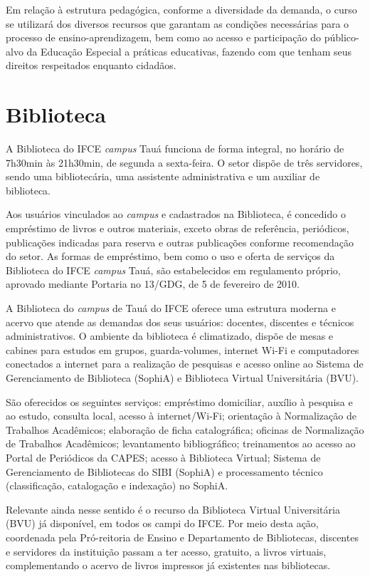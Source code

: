 \documentclass[
	12pt,				%
	openright,			%
	twoside,			%
	a4paper,			%
	chapter=TITLE,		%
	english,			%
	french,				%
	spanish,			%
	brazil,				%
	]{abntex2}
\begin{document}
Em relação à estrutura pedagógica, conforme a diversidade da demanda, o curso se utilizará dos diversos recursos que garantam as condições necessárias para o processo de ensino-aprendizagem, bem como ao acesso e participação do público-alvo da Educação Especial a práticas educativas, fazendo com que tenham seus direitos respeitados enquanto cidadãos.


\section{Biblioteca}

A Biblioteca do IFCE \textit{campus} Tauá funciona de forma integral, no horário de 7h30min às 21h30min, de segunda a sexta-feira. O setor dispõe de três servidores, sendo uma bibliotecária,  uma assistente administrativa e um auxiliar de biblioteca.

Aos usuários vinculados ao \textit{campus} e cadastrados na Biblioteca, é concedido o empréstimo de livros e outros materiais, exceto obras de referência, periódicos, publicações indicadas para reserva e outras publicações conforme recomendação do setor. As formas de empréstimo, bem como o uso e oferta de serviços da Biblioteca do IFCE \textit{campus} Tauá, são estabelecidos em regulamento próprio, aprovado mediante Portaria no 13/GDG, de 5 de fevereiro de 2010. 

A Biblioteca do \textit{campus} de Tauá do IFCE oferece uma estrutura moderna e acervo que atende as demandas dos seus usuários: docentes, discentes e técnicos administrativos. O ambiente da biblioteca é climatizado, dispõe de mesas e cabines para estudos em grupos, guarda-volumes, internet Wi-Fi e computadores conectados a internet para a realização de pesquisas e acesso online ao Sistema de Gerenciamento de Biblioteca (SophiA) e Biblioteca Virtual Universitária (BVU).

São oferecidos os seguintes serviços: empréstimo domiciliar, auxílio à pesquisa e ao estudo, consulta local, acesso à internet/Wi-Fi; orientação à Normalização de Trabalhos Acadêmicos; elaboração de ficha catalográfica; oficinas de Normalização de Trabalhos Acadêmicos; levantamento bibliográfico; treinamentos ao acesso ao Portal de Periódicos da CAPES; acesso à Biblioteca Virtual; Sistema de Gerenciamento de Bibliotecas do SIBI (SophiA) e processamento técnico (classificação, catalogação e indexação) no SophiA.

Relevante ainda nesse sentido é o recurso da Biblioteca Virtual Universitária (BVU) já disponível, em todos os campi do IFCE. Por meio desta  ação, coordenada pela Pró-reitoria de Ensino e Departamento de Bibliotecas, discentes e servidores da instituição passam a ter acesso, gratuito, a  livros virtuais, complementando o acervo de livros impressos já existentes nas bibliotecas. 
\end{document}
